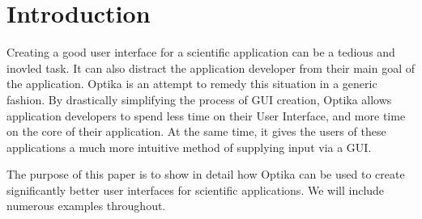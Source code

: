 \section{Introduction}
Creating a good user interface for a scientific application can be a tedious and inovled task. It can also distract
the application developer from their main goal of the application.
Optika is an attempt to remedy this situation in a generic fashion. By drastically simplifying the process
of GUI creation, Optika allows application developers to spend less time on their User Interface, and more time
on the core of their application. At the same time, it gives the users of these applications a much more 
intuitive method of supplying input via a GUI.

The purpose of this paper is to show in detail how Optika can be used to create
significantly better user interfaces for scientific applications. We will include
numerous examples throughout.
